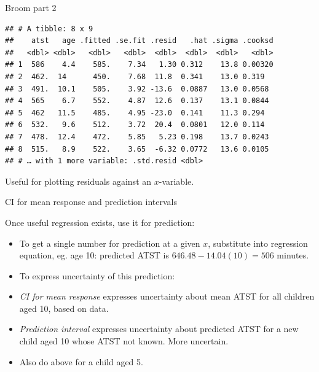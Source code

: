 \documentclass[ignorenonframetext,]{beamer}
\newenvironment{Shaded}{\begin{snugshade}}{\end{snugshade}}
\newcommand{\DecValTok}[1]{\textcolor[rgb]{0.00,0.00,0.81}{#1}}
\newcommand{\FloatTok}[1]{\textcolor[rgb]{0.00,0.00,0.81}{#1}}
\newcommand{\KeywordTok}[1]{\textcolor[rgb]{0.13,0.29,0.53}{\textbf{#1}}}
\newcommand{\NormalTok}[1]{#1}
\newcommand{\OperatorTok}[1]{\textcolor[rgb]{0.81,0.36,0.00}{\textbf{#1}}}
\newcommand{\StringTok}[1]{\textcolor[rgb]{0.31,0.60,0.02}{#1}}
\begin{document}
\begin{frame}[fragile]{Broom part 2}
\protect\hypertarget{broom-part-2}{}

\begin{Shaded}
\end{Shaded}

\begin{verbatim}
## # A tibble: 8 x 9
##    atst   age .fitted .se.fit .resid   .hat .sigma .cooksd
##   <dbl> <dbl>   <dbl>   <dbl>  <dbl>  <dbl>  <dbl>   <dbl>
## 1  586    4.4    585.    7.34   1.30 0.312    13.8 0.00320
## 2  462.  14      450.    7.68  11.8  0.341    13.0 0.319  
## 3  491.  10.1    505.    3.92 -13.6  0.0887   13.0 0.0568 
## 4  565    6.7    552.    4.87  12.6  0.137    13.1 0.0844 
## 5  462   11.5    485.    4.95 -23.0  0.141    11.3 0.294  
## 6  532.   9.6    512.    3.72  20.4  0.0801   12.0 0.114  
## 7  478.  12.4    472.    5.85   5.23 0.198    13.7 0.0243 
## 8  515.   8.9    522.    3.65  -6.32 0.0772   13.6 0.0105 
## # … with 1 more variable: .std.resid <dbl>
\end{verbatim}

Useful for plotting residuals against an \(x\)-variable.

\end{frame}

\begin{frame}{CI for mean response and prediction intervals}
\protect\hypertarget{ci-for-mean-response-and-prediction-intervals}{}

Once useful regression exists, use it for prediction:

\begin{itemize}
\item
  To get a single number for prediction at a given \(x\), substitute
  into regression equation, eg. age 10: predicted ATST is
  \(646.48-14.04(10)=506\) minutes.
\item
  To express uncertainty of this prediction:
\item
  \emph{CI for mean response} expresses uncertainty about mean ATST for
  all children aged 10, based on data.
\item
  \emph{Prediction interval} expresses uncertainty about predicted ATST
  for a new child aged 10 whose ATST not known. More uncertain.
\item
  Also do above for a child aged 5.
\end{itemize}

\end{frame}
\end{document}
